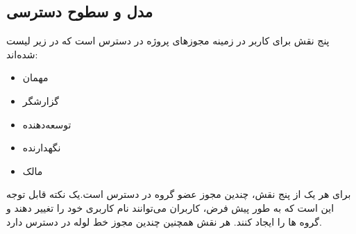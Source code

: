 \documentclass{CSICC}
\begin{document}
\subsection{مدل و سطوح دسترسی}
پنج نقش برای کاربر در زمینه مجوزهای پروژه در دسترس است که در زیر لیست شده‌اند:
\begin{itemize}
	\item مهمان
	\item گزارشگر
	\item توسعه‌دهنده
	\item نگهدارنده
	\item مالک
\end{itemize}
برای هر یک از پنج نقش، چندین مجوز عضو گروه در دسترس است.یک نکته قابل توجه این است که به طور پیش ‌فرض، کاربران می‌توانند نام کاربری خود را تغییر دهند و گروه‌ ها را ایجاد کنند.
هر نقش همچنین چندین مجوز خط لوله
  در دسترس دارد.
\end{document}
